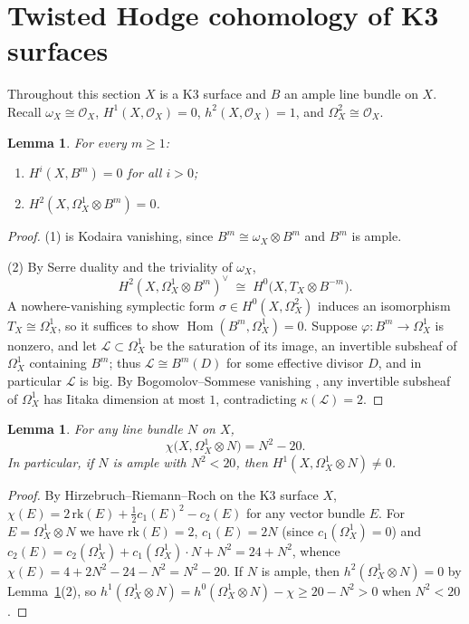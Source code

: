 \documentclass[11pt]{amsart}
\numberwithin{equation}{section}
\theoremstyle{plain}
\newtheorem{lemma}[theorem]{Lemma}
\theoremstyle{definition}
\theoremstyle{remark}
\newcommand{\cO}{\mathcal{O}}
\newcommand{\Hom}{\operatorname{Hom}}
\begin{document}
\section{Twisted Hodge cohomology of K3 surfaces}\label{sec:cohomology}

Throughout this section $X$ is a K3 surface and $B$ an ample line bundle on $X$.
Recall $\omega_X\cong\cO_X$, $H^1(X,\cO_X)=0$, $h^2(X,\cO_X)=1$, and $\Omega^2_X\cong\cO_X$.

\begin{lemma}\label{lem:vanishing}
For every $m\ge1$:
\begin{enumerate}
\item $H^i(X,B^m)=0$ for all $i>0$;
\item $H^2(X,\Omega^1_X\otimes B^m)=0$.
\end{enumerate}
\end{lemma}

\begin{proof}
(1) is Kodaira vanishing, since $B^m\cong\omega_X\otimes B^m$ and $B^m$ is ample.

(2) By Serre duality and the triviality of $\omega_X$,
\[
H^2(X,\Omega^1_X\otimes B^m)^\vee \;\cong\; H^0\!\big(X,T_X\otimes B^{-m}\big).
\]
A nowhere-vanishing symplectic form $\sigma\in H^0(X,\Omega^2_X)$ induces an isomorphism $T_X\cong\Omega^1_X$, so it suffices to show $\Hom(B^m,\Omega^1_X)=0$.
Suppose $\varphi\colon B^m\to\Omega^1_X$ is nonzero, and let $\mathcal{L}\subset\Omega^1_X$ be the saturation of its image, an invertible subsheaf of $\Omega^1_X$ containing $B^m$; thus $\mathcal{L}\cong B^m(D)$ for some effective divisor $D$, and in particular $\mathcal{L}$ is big.
By Bogomolov--Sommese vanishing \cite[Cor.~6.9]{EV}, any invertible subsheaf of $\Omega^1_X$ has Iitaka dimension at most $1$, contradicting $\kappa(\mathcal{L})=2$.
\end{proof}

\begin{lemma}\label{lem:RR}
For any line bundle $N$ on $X$,
\[
\chi\big(X,\Omega^1_X\otimes N\big)=N^2-20 .
\]
In particular, if $N$ is ample with $N^2<20$, then $H^1(X,\Omega^1_X\otimes N)\ne0$.
\end{lemma}

\begin{proof}
By Hirzebruch--Riemann--Roch on the K3 surface $X$, $\chi(E)=2\,\mathrm{rk}(E)+\tfrac12 c_1(E)^2-c_2(E)$ for any vector bundle $E$.
For $E=\Omega^1_X\otimes N$ we have $\mathrm{rk}(E)=2$, $c_1(E)=2N$ (since $c_1(\Omega^1_X)=0$) and
$c_2(E)=c_2(\Omega^1_X)+c_1(\Omega^1_X)\cdot N+N^2=24+N^2$,
whence $\chi(E)=4+2N^2-24-N^2=N^2-20$.
If $N$ is ample, then $h^2(\Omega^1_X\otimes N)=0$ by Lemma~\ref{lem:vanishing}(2), so
$h^1(\Omega^1_X\otimes N)=h^0(\Omega^1_X\otimes N)-\chi\ge 20-N^2>0$ when $N^2<20$.
\end{proof}
\end{document}
